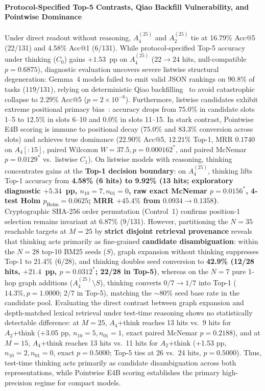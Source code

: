 \documentclass[10pt]{article}
\begin{document}
\paragraph{Protocol-Specified Top-5 Contrasts, Qiao Backfill Vulnerability, and Pointwise Dominance}
Under direct readout without reasoning, $A_4^{(25)}$ and $A_2^{(25)}$ tie at 16.79\% Acc@5 (22/131) and 4.58\% Acc@1 (6/131). While protocol-specified Top-5 accuracy under thinking ($C_0$) gains $+1.53$~pp on $A_4^{(25)}$ ($22 \to 24$ hits, null-compatible $p=0.6875$), diagnostic evaluation uncovers severe listwise structural degeneration: Gemma~4 models failed to emit valid JSON rankings on $90.8\%$ of tasks ($119/131$), relying on deterministic Qiao backfilling~\cite{qiao2024backfill} to avoid catastrophic collapse to $2.29\%$ Acc@5 ($p=2\times 10^{-6}$). Furthermore, listwise candidates exhibit extreme positional primacy bias~\cite{liu2024lostinmiddle}: accuracy drops from $75.0\%$ in candidate slots 1--5 to $12.5\%$ in slots 6--10 and $0.0\%$ in slots 11--15. In stark contrast, Pointwise E4B scoring is immune to positional decay ($75.0\%$ and $83.3\%$ conversion across slots) and achieves true dominance ($22.90\%$ Acc@5, $12.21\%$ Top-1, MRR $0.1740$ on $A_4[:15]$, paired Wilcoxon $W=37.5, p=0.000162^*$, and paired McNemar $p=0.0129^*$ vs.\ listwise $C_1$). On listwise models with reasoning, thinking concentrates gains at the \textbf{Top-1 decision boundary}: on $A_4^{(25)}$, thinking lifts Top-1 accuracy from \textbf{4.58\% (6 hits) to 9.92\% (13 hits; exploratory diagnostic $+5.34$~pp, $n_{10}=7, n_{01}=0$, raw exact McNemar $p=0.0156^*$, 4-test Holm $p_{\text{Holm}}=0.0625$; MRR $+45.4\%$ from $0.0934 \to 0.1358$)}. Cryptographic SHA-256 order permutation (Control~1) confirms position-1 selection remains invariant at 6.87\% (9/131). However, partitioning the $N=35$ reachable targets at $M=25$ by \textbf{strict disjoint retrieval provenance} reveals that thinking acts primarily as fine-grained \textbf{candidate disambiguation}: within the $N=28$ top-10 BM25 seeds ($S$), graph expansion without thinking suppresses Top-1 to 21.4\% (6/28), and thinking doubles seed conversion to \textbf{42.9\% (12/28 hits, $+21.4$~pp, $p=0.0312^*$; 22/28 in Top-5)}, whereas on the $N=7$ pure 1-hop graph additions ($A_4^{(25)} \setminus S$), thinking converts $0/7 \to 1/7$ into Top-1 ($14.3\%, p=1.0000$; $2/7$ in Top-5), matching the $\sim 80\%$ seed base rate in the candidate pool. Evaluating the direct contrast between graph expansion and depth-matched lexical retrieval under test-time reasoning shows no statistically detectable difference: at $M=25$, $A_4\text{+think}$ reaches 13 hits vs.\ 9 hits for $A_2\text{+think}$ (+3.05 pp, $n_{10}=5, n_{01}=1$, exact paired McNemar $p = 0.2188$), and at $M=15$, $A_4\text{+think}$ reaches 13 hits vs.\ 11 hits for $A_2\text{+think}$ (+1.53 pp, $n_{10}=2, n_{01}=0$, exact $p = 0.5000$; Top-5 ties at 26 vs.\ 24 hits, $p = 0.5000$). Thus, test-time thinking acts primarily as candidate disambiguation across both representations, while Pointwise E4B scoring establishes the primary high-precision regime for compact models.
\end{document}
